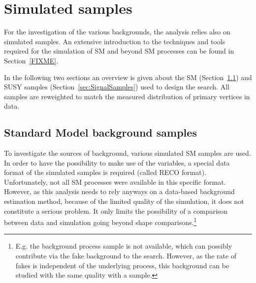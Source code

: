 \chapter{Simulated samples}
\label{sec:SimulatedSamples}

For the investigation of the various backgrounds, the analysis relies also on simulated samples.
An extensive introduction to the techniques and tools required for the simulation of SM and beyond SM processes can be found in Section~\ref{FIXME}.

In the following two sections an overview is given about the SM (Section~\ref{sec:SMSamples}) and SUSY samples (Section~\ref{sec:SignalSamples}) used to design the search.
All samples are reweighted to match the measured distribution of primary vertices in data.

\section{Standard Model background samples}
\label{sec:SMSamples}
To investigate the sources of background, various simulated SM samples are used.
In order to have the possibility to make use of the \dedx variables, a special data format of the simulated samples is required (called RECO format).
Unfortunately, not all SM processes were available in this specific format.
However, as this analysis needs to rely anyways on a data-based background estimation method, because of the limited quality of the \dedx simulation,
it does not constitute a serious problem.
It only limits the possibility of a comparison between data and simulation going beyond shape comparisons.\footnote{E.g. the background process \ZInvJets sample is not available, which can possibly contribute via the fake background to the search. However, as the rate of fakes is independent of the underlying process, this background can be studied with the same quality with a \WJets sample.}


